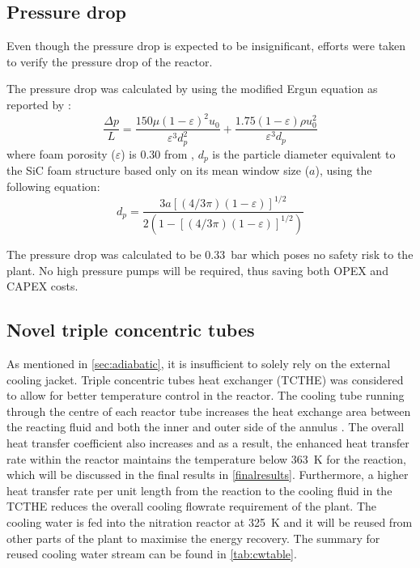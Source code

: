 \subsection{Pressure drop}
Even though the pressure drop is expected to be insignificant, efforts were taken to verify the pressure drop of the reactor.

The pressure drop was calculated by using the modified Ergun equation as reported by \textcite{lacroix_pressure_2007}: 
\begin{equation}
    \frac{\Delta p}{L} = \frac{150 \mu (1- \varepsilon)^2 u_0}{\varepsilon^3 d_p^2} + \frac{1.75(1-\varepsilon)\rho u_0^2}{\varepsilon^3 d_p}
    \label{eqn:ergun}
\end{equation}
where foam porosity ($\varepsilon$) is 0.30 from \cite{jang_thermophysical_2007}, $d_p$ is the particle diameter equivalent to the SiC foam structure based only on its mean window size ($a$), using the following equation:
\begin{equation}
d_{p}=\frac{3a[(4 / 3 \pi)(1-\varepsilon)]^{1 / 2}}{2(1-[(4 / 3 \pi)(1-\varepsilon)]^{1 / 2})}
\end{equation}

The pressure drop was calculated to be \SI{0.33}{\bar} which poses no safety risk to the plant. No high pressure pumps will be required, thus saving both OPEX and CAPEX costs.

\subsection{Novel triple concentric tubes}
\label{sec:tripleconctube}
As mentioned in \cref{sec:adiabatic}, it is insufficient to solely rely on the external cooling jacket. Triple concentric tubes heat exchanger (TCTHE) was considered to allow for better temperature control in the reactor. The cooling tube running through the centre of each reactor tube increases the heat exchange area between the reacting fluid and both the inner and outer side of the annulus \cite{moya-rico_characterization_2019}. The overall heat transfer coefficient also increases \cite{radulescu_analysis_2016} and as a result, the enhanced heat transfer rate within the reactor maintains the temperature below \SI{363}{\K} for the reaction, which will be discussed in the final results in \cref{finalresults}. Furthermore, a higher heat transfer rate per unit length from the reaction to the cooling fluid in the TCTHE reduces the overall cooling flowrate requirement of the plant. The cooling water is fed into the nitration reactor at \SI{325}{\K} and it will be reused from other parts of the plant to maximise the energy recovery. The summary for reused cooling water stream can be found in \cref{tab:cwtable}.
